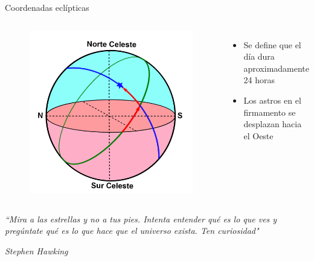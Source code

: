 \documentclass{beamer}
\begin{document}
\begin{frame}{Coordenadas eclípticas}
 \begin{columns}
  \begin{figure}
   \centering
   \includegraphics[scale=0.14]{Imagenes/C_Eclip_01}
  \end{figure}
 \small
 \justify
\begin{itemize}
\item Se define que el día dura aproximadamente 24 horas
\item Los astros en el firmamento se desplazan hacia el Oeste
\end{itemize}
 \end{columns}
\end{frame}


\begin{frame}
\begin{center}
\Huge 
\textit{``Mira a las estrellas y no a tus pies. Intenta entender qué es lo que ves y pregúntate qué es lo que hace que el universo exista. Ten curiosidad"}
\end{center}
\begin{flushright}
\small
\textit{Stephen Hawking}
\end{flushright}
\end{frame}
\end{document}
